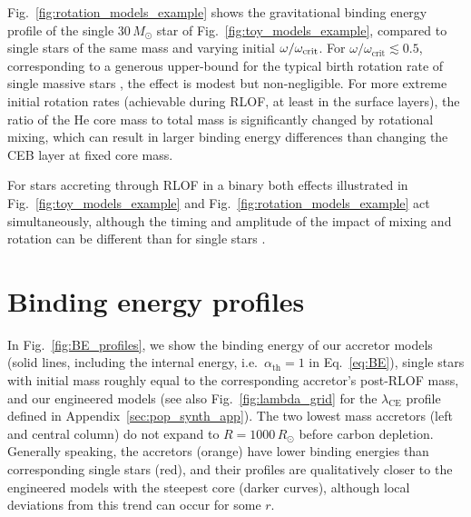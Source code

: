 \documentclass[twocolumn,twocolappendix,trackchanges]{aastex63}
\DeclareRobustCommand{\Eqref}[1]{Eq.~\ref{#1}}
\DeclareRobustCommand{\Figref}[1]{Fig.~\ref{#1}}
\begin{document}
\Figref{fig:rotation_models_example} shows the gravitational binding
energy profile of the single $30\,M_\odot$ star of
\Figref{fig:toy_models_example}, compared to single stars of the same
mass and varying initial $\omega/\omega_{\rm crit}$. %
For $\omega/\omega_\mathrm{crit}\lesssim 0.5$, corresponding to a
generous upper-bound for the typical birth rotation rate of single
massive stars \citep[e.g.,][]{ramirez-agudelo:2015}, the effect is
modest but non-negligible. For more extreme initial rotation rates
(achievable during RLOF, at least in the surface layers), the ratio of
the He core mass to total mass is significantly changed by rotational
mixing, which can result in larger binding energy differences than
changing the CEB layer at fixed core mass.


For stars accreting through RLOF in a binary both
effects illustrated in \Figref{fig:toy_models_example} and
\Figref{fig:rotation_models_example} act simultaneously, although the
timing and amplitude of the impact of mixing and rotation can be
different than for single stars \citep[e.g.,][]{renzo:2021zoph}.


\section{Binding energy profiles}
\label{sec:BE}

In \Figref{fig:BE_profiles}, we show the binding energy of our
accretor models (solid lines,
including the internal energy, i.e.\ $\alpha_\mathrm{th}=1$ in
\Eqref{eq:BE}),
single stars with initial mass roughly equal
to the corresponding accretor's post-RLOF mass, and our engineered models (see also
\Figref{fig:lambda_grid} for the $\lambda_\mathrm{CE}$ profile defined in Appendix~\ref{sec:pop_synth_app}). The two
lowest mass accretors (left and central column) do not expand to
$R=1000\, R_\odot$ before carbon depletion. Generally speaking, the
accretors (orange) have lower binding energies than corresponding
single stars (red), and their profiles are qualitatively closer to the
engineered models with the steepest core (darker curves), although
local deviations from this trend can occur for some $r$.
\end{document}
